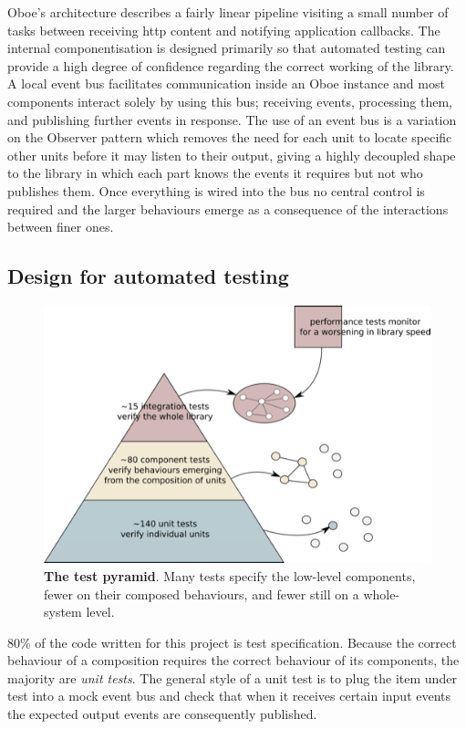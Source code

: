 \documentclass[12pt, ]{article}
\makeatletter
\def\maxwidth{\ifdim\Gin@nat@width>\linewidth\linewidth
\else\Gin@nat@width\fi}
\let\Oldincludegraphics\includegraphics
\renewcommand{\includegraphics}[1]{\Oldincludegraphics[width=\maxwidth]{#1}}
\makeatother
\begin{document}
Oboe's architecture describes a fairly linear pipeline visiting a small
number of tasks between receiving http content and notifying application
callbacks. The internal componentisation is designed primarily so that
automated testing can provide a high degree of confidence regarding the
correct working of the library. A local event bus facilitates
communication inside an Oboe instance and most components interact
solely by using this bus; receiving events, processing them, and
publishing further events in response. The use of an event bus is a
variation on the Observer pattern which removes the need for each unit
to locate specific other units before it may listen to their output,
giving a highly decoupled shape to the library in which each part knows
the events it requires but not who publishes them. Once everything is
wired into the bus no central control is required and the larger
behaviours emerge as a consequence of the interactions between finer
ones.

\subsection{Design for automated
testing}\label{design-for-automated-testing}

\begin{figure}[htbp]
\centering
\includegraphics{images/testPyramid.png}
\caption{\textbf{The test pyramid}. Many tests specify the low-level
components, fewer on their composed behaviours, and fewer still on a
whole-system level. \label{testpyramid}}
\end{figure}

80\% of the code written for this project is test specification. Because
the correct behaviour of a composition requires the correct behaviour of
its components, the majority are \emph{unit tests}. The general style of
a unit test is to plug the item under test into a mock event bus and
check that when it receives certain input events the expected output
events are consequently published.
\end{document}
